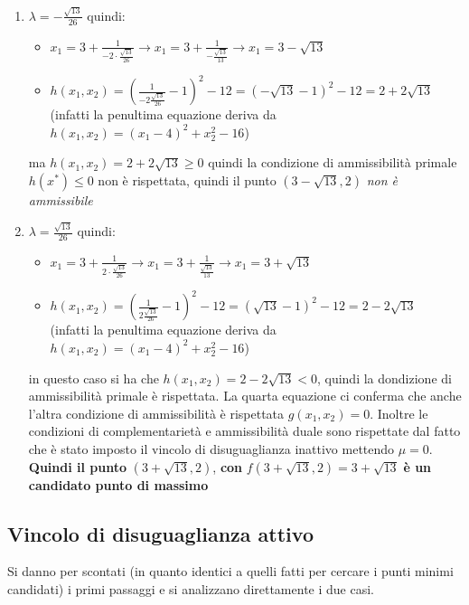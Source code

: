 \documentclass[a4paper,12pt, oneside]{book}
\begin{document}
\begin{enumerate}
  \item $\lambda = -\frac{\sqrt{13}}{26}$ quindi:
  \begin{itemize}
    \item $x_1=3+\frac{1}{-2\cdot \frac{\sqrt{13}}{26}}\to
    x_1=3+\frac{1}{-\frac{\sqrt{13}}{13}}\to x_1=3-\sqrt{13}$
    \item
    $h(x_1,x_2)=(\frac{1}{-2\frac{\sqrt{13}}{26}}-1)^2-12=(-\sqrt{13}-1)^2-12=
    2+2\sqrt{13}$ \\(infatti la penultima equazione deriva da
    $h(x_1,x_2)=(x_1-4)^2+x_2^2-16$) 
  \end{itemize}
  ma $h(x_1,x_2)=2+2\sqrt{13}\geq 0$ quindi la condizione di
  ammissibilità primale $h(x^*)\leq 0$ non è rispettata, quindi il
  punto $(3-\sqrt{13},2)$ \textit{non è ammissibile}
  
  \item $\lambda = \frac{\sqrt{13}}{26}$ quindi:
  \begin{itemize}
    \item $x_1=3+\frac{1}{2\cdot \frac{\sqrt{13}}{26}}\to
    x_1=3+\frac{1}{\frac{\sqrt{13}}{13}}\to x_1=3+\sqrt{13}$
    \item
    $h(x_1,x_2)=(\frac{1}{2\frac{\sqrt{13}}{26}}-1)^2-12=(\sqrt{13}-1)^2-12=
    2-2\sqrt{13}$ \\(infatti la penultima equazione deriva da
    $h(x_1,x_2)=(x_1-4)^2+x_2^2-16$) 
  \end{itemize}
  in questo caso si ha che $h(x_1,x_2)=2-2\sqrt{13}< 0$, quindi la
  dondizione di ammissibilità primale è rispettata. La quarta
  equazione ci conferma che anche l'altra condizione di ammissibilità
  è rispettata $g(x_1,x_2)=0$. Inoltre le condizioni di
  complementarietà e ammissibilità duale sono rispettate dal fatto che
  è stato imposto il vincolo di disuguaglianza inattivo mettendo
  $\mu=0$. \\
 \textbf{ Quindi il punto} $(3+\sqrt{13},2)$,\textbf{ con}
  $f(3+\sqrt{13},2)=3+\sqrt{13}$\textbf{ è un }\textbf{candidato punto di
    massimo} 
\end{enumerate}
\subsection{Vincolo di disuguaglianza attivo}
Si danno per scontati (in quanto identici a quelli fatti per cercare i
punti minimi candidati) i primi passaggi e si analizzano direttamente i
due casi.
\end{document}
